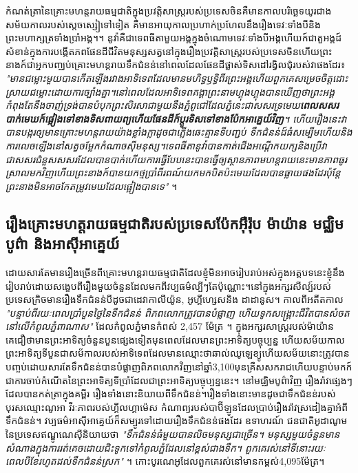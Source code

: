 \documentclass[10pt,twocolumn,letterpaper]{article}
\begin{document}
 កំណត់ត្រានៃគ្រោះមហន្តរាយធម្មជាតិក្នុងប្រវត្តិសាស្ត្ររបស់ប្រទេសចិនគឺមានកាលបរិច្ឆេទយូរជាងសម័យកាលរបស់ស្តេចស្សៀទៅទៀត គឺមានអាយុកាលប្រហាក់ប្រហែលនឹងរឿងទេវៈទាំងបីនិងព្រះមហាក្សត្រទាំងប្រាំអង្គ។\cite{7}។ នូវ៉ាគឺជាទេពធីតាមួយអង្គក្នុងចំណោមទេវៈទាំងបីអង្គ​ហើយក៍ជាតួអង្គដ៍សំខាន់ក្នុងការបង្កើតភពផែនដី​ជីវិតមនុស្ស​សត្វនៅក្នុងរឿងប្រវត្តិសាស្ត្ររបស់ប្រទេសចិន​ហើយព្រះនាងក៍ជាអ្នកបញ្ឈប់គ្រោះមហន្តរាយទឹកជំនន់នៅពេលដែលផែនដីផ្លាស់ទិសដៅរង្វិលជុំរបស់វាផងដែរ៖ \textit{"មានជម្លោះមួយបានកើតឡើងរវាងអាទិទេពដែលមានមហិទ្ធឫទ្ធិពីរព្រះអង្គ​ហើយពួកគេសម្រេចចិត្តដោះស្រាយជម្លោះដោយការច្បាំងគ្នា។​នៅពេលដែលអាទិទេពគង្គាព្រះនាម​ហ្គុង​ហ្គុងបានឃើញថាព្រះអង្គកំពុងតែនឹងចាញ់​ទ្រង់បានបំបុកព្រះសិរសាជាមួយនឹងភ្នំពូជៅដែលភ្នំនេះជាសសរទ្រមេឃ​ \textbf{ពេលសសរបាក់​មេឃក៍ផ្អៀងទៅខាងទិសពាយព្យ​ហើយផែនដីក៍ប្តូរទិសទៅខាងប៉ែកអាគ្នេយ៍វិញ}។ ហើយរឿងនេះវាបានបង្ករឲ្យមានគ្រោះមហន្តរាយយ៉ាងខ្លាំងក្លាដូចជា​ភ្លើងឆេះគ្មានទីបញ្ជប់ ទឹកជំនន់ដ៍ធំសម្បើម​ហើយនិងការលេចឡើងនៅសត្វចម្លែកកំណាចស៊ីមនុស្ស។ទេពធីតានូវ៉ាបានកាត់ជើងអណ្តើកយក្សនិងប្រើវាជាសសរជំនួសសសរដែលបានបាក់​ហើយការធ្វើបែបនេះបានធ្វើឲ្យស្ថានភាពមហន្តរាយនេះមានភាពធូរស្រាលមកវិញ​ហើយព្រះនាងក៍បានយកថ្មប្រាំពីរពណ៍យកមកបិតប៉ះមេឃដែលបានធ្លាយផងដែរ​ប៉ុន្តែព្រះនាងមិនអាចកែតម្រូវមេឃដែលផ្អៀងបានទេ​"} \cite{8}។

\subsection{រឿងគ្រោះមហត្តរាយធម្មជាតិរបស់ប្រទេសប៉ែកអ៊ឺរ៉ុប ម៉ាយ៉ាន មជ្ឈិមបូព៌ា និងអាស៊ីអាគ្នេយ៍}

ដោយសារតែមានរឿងច្រើនពីគ្រោះមហន្តរាយធម្មជាតិដែលខ្ញុំមិនអាចរៀបរាប់អស់ក្នុងអត្តបទនេះ​ខ្ញុំនឹងរៀបរាប់ដោយសង្ខេបពីរឿងមួយចំនួនដែលមកពីវប្បធម៌ល្បីៗតែប៉ុណ្ណោះ។នៅក្នុងអក្សរសីល្ប៍របស់ប្រទេសក្រិចមានរឿងទឹកជំនន់បីដូចជា​ដេវាកាលីយ៉ូន, អូហ្គីហ្សេស​និង ដាដានូស​\cite{9,10}។ កាលពីអតីតកាល \textit{"បន្ទាប់ពីរយៈពេលប្រាំបួនថ្ងៃនៃទឹកជំនន់ ពិភពលោកត្រូវបានបំផ្លាញ ហើយទូកសង្រ្គោះជីវិតបានសំចតនៅលើកំពូលភ្នំពាណាស"} ដែលកំពូលភ្នំមានកំពស់ 2,457 ម៉ែត្រ \cite{11}។ ក្នុងអក្សរសាស្ត្ររបស់ម៉ាយ៉ានគេជឿថាមានព្រះអាទិត្យចំនួនបួនផ្សេងទៀតមុនពេលដែលមានព្រះអាទិត្យបច្ចុប្បន្ន ហើយសម័យកាលព្រះអាទិត្យទីបួនជាសម័កាលរបស់អាទិទេពដែលមានឈ្មោះថាឆាល់ឈូឡេខ្យូហើយសម័យនោះត្រូវបានបញ្ចប់ដោយសារតែទឹកជំនន់បានបំផ្លាញពិភពលោកវិញនៅឆ្នាំ3,100មុនគ្រឺសសករាជ​ហើយបន្ទាប់មកក៍ជាការចាប់កំណើតនៃព្រះអាទិត្យទីប្រាំដែលជាព្រះអាទិត្យបច្ចុប្បន្ននេះ\cite{12}។ នៅមជ្ឈិមបូព៌ាវិញ រឿងរ៉ាវផ្សេងៗដែលបានកត់ត្រាក្នុងគម្ពីរ រឿងទាំងនោះនិយាយពីទឹកជំនន់។រឿងទាំងនោះមានដូចជា​ទឹកជំនន់របស់បុរសឈ្មោះណូអា វីរៈភាពរបស់​ហ្គីលហ្គាម៉េស កំណាព្យរបស់បាប៊ីឡូនដែលប្រាប់រឿងរ៉ាវស្រដៀងគ្នាអំពីទឹកជំនន់\cite{13}។ វប្បធម៌អាស៊ីអាគ្នេយ៍ក៏សម្បូរទៅដោយរឿងទឹកជំនន់ផងដែរ ឧទាហរណ៍ ជនជាតិអូដាណូមនៃប្រទេសឥណ្ឌូណេស៊ីនិយាយថា \textit{"ទឹកជំនន់ធំមួយបានលិចមនុស្សជាច្រើន។ មនុស្សមួយចំនួនមានសំណាងក្នុងការរត់គេចដោយជិះទូកទៅកំពូលភ្នំដែលនៅខ្ពស់ជាងទឹក។ ពួកគេរស់នៅទីនោះរយៈពេលបីខែរហូតដល់ទឹកជំនន់ស្រក"} \cite{3}។ កោះបូរណេអូដែលពួកគេរស់នៅមានកម្ពស់​4,095ម៉ែត្រ។
\end{document}
